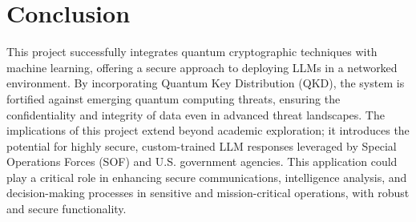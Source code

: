 \documentclass{article}
\begin{document}
\section{Conclusion}
This project successfully integrates quantum cryptographic techniques with machine learning, offering a secure approach to deploying LLMs in a networked environment. By incorporating Quantum Key Distribution (QKD), the system is fortified against emerging quantum computing threats, ensuring the confidentiality and integrity of data even in advanced threat landscapes. The implications of this project extend beyond academic exploration; it introduces the potential for highly secure, custom-trained LLM responses leveraged by Special Operations Forces (SOF) and U.S. government agencies. This application could play a critical role in enhancing secure communications, intelligence analysis, and decision-making processes in sensitive and mission-critical operations, with robust and secure functionality. 
\end{document}
